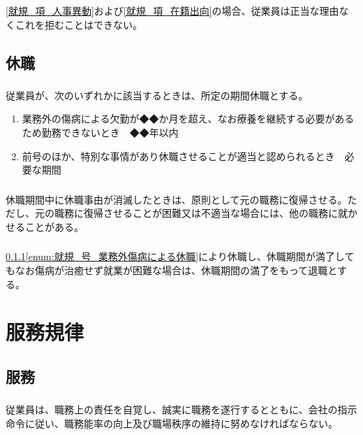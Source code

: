 \documentclass{jsarticle}
\begin{document}
\subsubsection{}
\label{就規_項_人事異動・在籍出向の正当な理由無き拒否の禁止}
\ref{就規_項_人事異動}および\ref{就規_項_在籍出向}の場合、従業員は正当な理由なくこれを拒むことはできない。

\subsection{休職}
\label{就規_条_休職}
\subsubsection{}
\label{就規_項_休職}
従業員が、次のいずれかに該当するときは、所定の期間休職とする。
\begin{enumerate}
  \item 業務外の傷病による欠勤が◆◆か月を超え、なお療養を継続する必要があるため勤務できないとき　◆◆年以内\label{enum:就規_号_業務外傷病による休職}
  \item 前号のほか、特別な事情があり休職させることが適当と認められるとき　必要な期間
\end{enumerate}
\subsubsection{}
\label{就規_項_休職からの復帰}
休職期間中に休職事由が消滅したときは、原則として元の職務に復帰させる。ただし、元の職務に復帰させることが困難又は不適当な場合には、他の職務に就かせることがある。
\subsubsection{}
\label{就規_項_休職期間満了による退職}
\ref{就規_項_休職}\ref{enum:就規_号_業務外傷病による休職}により休職し、休職期間が満了してもなお傷病が治癒せず就業が困難な場合は、休職期間の満了をもって退職とする。

\section{服務規律}
\label{就規_章_服務規律}

\subsection{服務}
\label{就規_条_服務}
\subsubsection{}
\label{就規_項_服務}
従業員は、職務上の責任を自覚し、誠実に職務を遂行するとともに、会社の指示命令に従い、職務能率の向上及び職場秩序の維持に努めなければならない。
\end{document}
